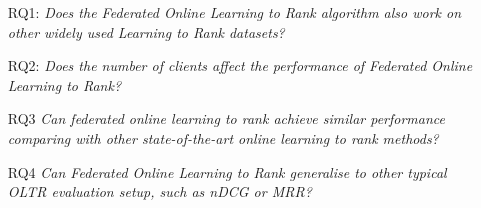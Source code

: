 \begin{itemize}
	\item[RQ1:] \textit{Does the Federated Online Learning to Rank algorithm also work on other widely used Learning to Rank datasets?}
	\item[RQ2:] \textit{Does the number of clients affect the performance of Federated Online Learning to Rank?}
	\item[RQ3] \textit{Can federated online learning to rank achieve similar performance comparing with other state-of-the-art online learning to rank methods?}
	\item[RQ4] \textit{Can Federated Online Learning to Rank generalise to other typical OLTR evaluation setup, such as nDCG or MRR?}
\end{itemize}

